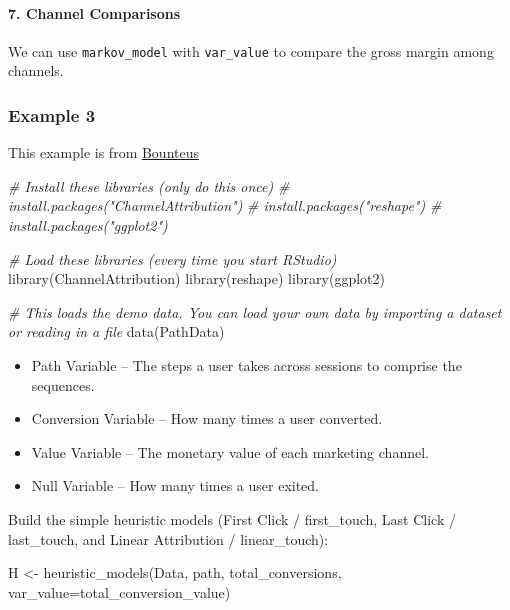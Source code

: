 \documentclass[
]{book}
\newenvironment{Shaded}{\begin{snugshade}}{\end{snugshade}}
\newcommand{\AttributeTok}[1]{\textcolor[rgb]{0.77,0.63,0.00}{#1}}
\newcommand{\CommentTok}[1]{\textcolor[rgb]{0.56,0.35,0.01}{\textit{#1}}}
\newcommand{\FunctionTok}[1]{\textcolor[rgb]{0.00,0.00,0.00}{#1}}
\newcommand{\NormalTok}[1]{#1}
\newcommand{\OtherTok}[1]{\textcolor[rgb]{0.56,0.35,0.01}{#1}}
\newcommand{\StringTok}[1]{\textcolor[rgb]{0.31,0.60,0.02}{#1}}
\providecommand{\tightlist}{%
  \setlength{\itemsep}{0pt}\setlength{\parskip}{0pt}}
\begin{document}
\hypertarget{channel-comparisons}{%
\paragraph{7. Channel Comparisons}\label{channel-comparisons}}

We can use \texttt{markov\_model} with \texttt{var\_value} to compare the gross margin among channels.

\hypertarget{example-3}{%
\subsubsection{Example 3}\label{example-3}}

This example is from \href{https://www.bounteous.com/insights/2016/06/30/marketing-channel-attribution-markov-models-r/}{Bounteus}

\begin{Shaded}
\begin{Highlighting}[]
\CommentTok{\# Install these libraries (only do this once)}
\CommentTok{\# install.packages("ChannelAttribution")}
\CommentTok{\# install.packages("reshape")}
\CommentTok{\# install.packages("ggplot2")}

\CommentTok{\# Load these libraries (every time you start RStudio)}
\FunctionTok{library}\NormalTok{(ChannelAttribution)}
\FunctionTok{library}\NormalTok{(reshape)}
\FunctionTok{library}\NormalTok{(ggplot2)}

\CommentTok{\# This loads the demo data. You can load your own data by importing a dataset or reading in a file}
\FunctionTok{data}\NormalTok{(PathData)}
\end{Highlighting}
\end{Shaded}

\begin{itemize}
\tightlist
\item
  Path Variable -- The steps a user takes across sessions to comprise the sequences.
\item
  Conversion Variable -- How many times a user converted.
\item
  Value Variable -- The monetary value of each marketing channel.
\item
  Null Variable -- How many times a user exited.
\end{itemize}

Build the simple heuristic models (First Click / first\_touch, Last Click / last\_touch, and Linear Attribution / linear\_touch):

\begin{Shaded}
\begin{Highlighting}[]
\NormalTok{H }\OtherTok{\textless{}{-}} \FunctionTok{heuristic\_models}\NormalTok{(Data, }\StringTok{\textquotesingle{}path\textquotesingle{}}\NormalTok{, }\StringTok{\textquotesingle{}total\_conversions\textquotesingle{}}\NormalTok{, }\AttributeTok{var\_value=}\StringTok{\textquotesingle{}total\_conversion\_value\textquotesingle{}}\NormalTok{)}
\end{Highlighting}
\end{Shaded}
\end{document}
